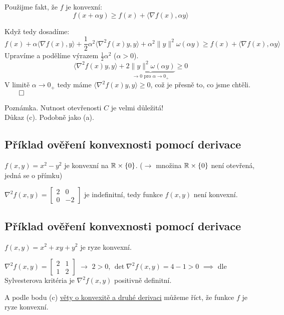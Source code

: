 Použijme fakt, že $f$ je konvexní:
\[
    f(x+\alpha y) \geq f(x) + \langle \nabla f(x), \alpha y\rangle
\]

Když tedy dosadíme:
\[
    f(x) + \alpha \langle \nabla f(x), y\rangle + \frac{1}{2}\alpha^2 \langle \nabla^2 f(x)y, y\rangle
    + \alpha^2 \| y\|^2 \omega(\alpha y) \geq f(x) + \langle \nabla f(x), \alpha y\rangle
\]
Upravíme a podělíme výrazem $\frac{1}{2}\alpha^2$ ($\alpha > 0$).
\[
   \langle \nabla^2 f(x)y, y\rangle + \underbrace{2 \| y\|^2 \omega(\alpha y)}_{\rightarrow 0 \text{ pro } 
   \alpha \rightarrow 0_+} \geq 0
\]
V limitě $\alpha \rightarrow 0_+$ tedy máme $\langle \nabla^2 f(x)y, y\rangle \geq 0$, což je přesně to, co jsme chtěli.
$\qed$

Poznámka. Nutnost otevřenosti $C$ je velmi důležitá!
\\

Důkaz (c). Podobně jako (a).

\subsection{Příklad ověření konvexnosti pomocí derivace}
$f(x, y) = x^2 - y^2$ je konvexní na $\mathbb{R} \times \left\lbrace 0 \right\rbrace$. ($\rightarrow$ množina $\mathbb{R} \times \left\lbrace 0 \right\rbrace$ není 
otevřená, jedná se o přímku)

$\nabla^2 f(x, y) = 
\begin{bmatrix}
    2 & 0 \\
    0 & -2
\end{bmatrix}$ je indefinitní, tedy funkce $f(x, y)$ není konvexní.

\subsection{Příklad ověření konvexnosti pomocí derivace}
$f(x, y) = x^2 + xy + y^2$ je ryze konvexní.

$\nabla^2 f(x, y) = 
\begin{bmatrix}
    2 & 1 \\
    1 & 2
\end{bmatrix}$ $\rightarrow$ $2>0$, $\det \nabla^2 f(x,y) = 4-1>0$ $\implies$ dle Sylvesterova kritéria je 
$\nabla^2 f(x,y)$ positivně definitní.

A podle bodu (c) \hyperref[konvDDeriv]{věty o konvexitě a druhé derivaci} můžeme říct, že funkce $f$ je ryze konvexní.
\newpage
